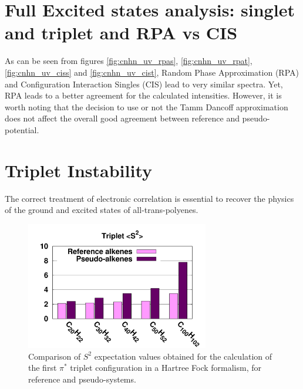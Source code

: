 \documentclass[aip]{revtex4-1}
\begin{document}
\section*{Full Excited states analysis: singlet and triplet and RPA vs CIS}
As can be seen from figures \ref{fig:cnhn_uv_rpas}, \ref{fig:cnhn_uv_rpat},
\ref{fig:cnhn_uv_ciss} and \ref{fig:cnhn_uv_cist}, Random Phase Approximation (RPA)
and Configuration Interaction Singles (CIS) lead to very similar spectra.
Yet, RPA leads to a better agreement for the calculated intensities.
However, it is worth noting that the decision to use or not the Tamm Dancoff approximation
does not affect the overall good agreement between reference and pseudo-potential.

\section*{Triplet Instability}
The correct treatment of electronic correlation is essential to recover the physics of the ground
and excited states of all-trans-polyenes.\cite{paldus_bond_1983, houk_polyacene_2001, colvin_energies_1998, castano_instabilities_1982, ukrainsky_electronic_1972, sokolov_time-dependent_2017, nakayama_theoretical_1998}

\begin{figure}
\begin{center}
\includegraphics[width=8cm]{long_pbe0_s2}
\end{center}
\caption{Comparison of $S^2$ expectation values obtained for the calculation
of the first $\pi^*$ triplet configuration in a Hartree Fock formalism, for reference
and pseudo-systems.}
\label{fig:ssquare}
\end{figure}
\end{document}

